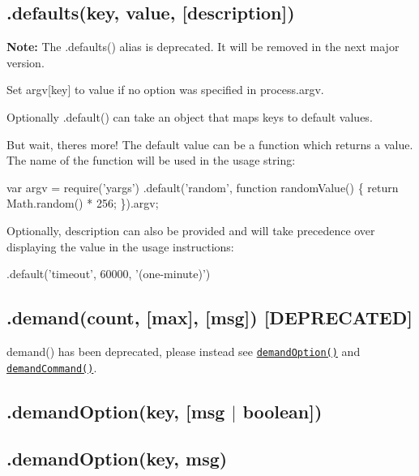 \subsection*{.defaults(key, value, \mbox{[}description\mbox{]}) }

{\bfseries Note\+:} The {\ttfamily .defaults()} alias is deprecated. It will be removed in the next major version.

Set {\ttfamily argv\mbox{[}key\mbox{]}} to {\ttfamily value} if no option was specified in {\ttfamily process.\+argv}.

Optionally {\ttfamily .default()} can take an object that maps keys to default values.

But wait, there\textquotesingle{}s more! The default value can be a {\ttfamily function} which returns a value. The name of the function will be used in the usage string\+:


\begin{DoxyCode}
var argv = require('yargs')
  .default('random', function randomValue() \{
    return Math.random() * 256;
  \}).argv;
\end{DoxyCode}


Optionally, {\ttfamily description} can also be provided and will take precedence over displaying the value in the usage instructions\+:


\begin{DoxyCode}
.default('timeout', 60000, '(one-minute)')
\end{DoxyCode}


\subsection*{\label{_demand}%
.demand(count, \mbox{[}max\mbox{]}, \mbox{[}msg\mbox{]}) \mbox{[}D\+E\+P\+R\+E\+C\+A\+T\+ED\mbox{]} }

{\ttfamily demand()} has been deprecated, please instead see \href{#demandOption}{\tt {\ttfamily demand\+Option()}} and \href{#demandCommand}{\tt {\ttfamily demand\+Command()}}.

\subsection*{\label{_demandOption}%
.demand\+Option(key, \mbox{[}msg $\vert$ boolean\mbox{]}) }

\subsection*{.demand\+Option(key, msg) }

